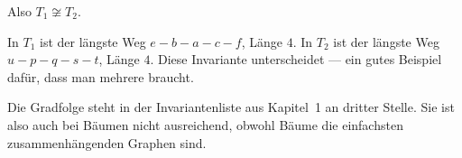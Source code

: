 \begin{aufgabe}
Also $T_1 \not\cong T_2$.

 In $T_1$ ist der längste Weg $e - b - a - c - f$, Länge $4$. In $T_2$ ist der längste Weg $u - p - q - s - t$, Länge $4$. Diese Invariante unterscheidet  --- ein gutes Beispiel dafür, dass man mehrere braucht.

Die Gradfolge steht in der Invariantenliste aus Kapitel~1 an dritter Stelle. Sie ist also auch bei Bäumen nicht ausreichend, obwohl Bäume die einfachsten zusammenhängenden Graphen sind.

\begin{center}
\begin{minipage}{0.86\textwidth}
\end{minipage}
\end{center}
\end{aufgabe}

